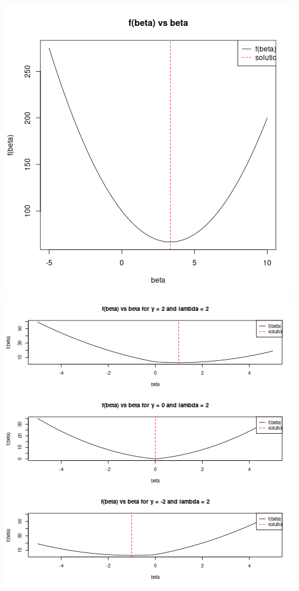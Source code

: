 \documentclass{article}
\begin{document}
\includegraphics[scale=0.5]{ch6q6-0.png}
\includegraphics[scale=0.5]{ch6q6-1.png}

\newpage
\end{document}

